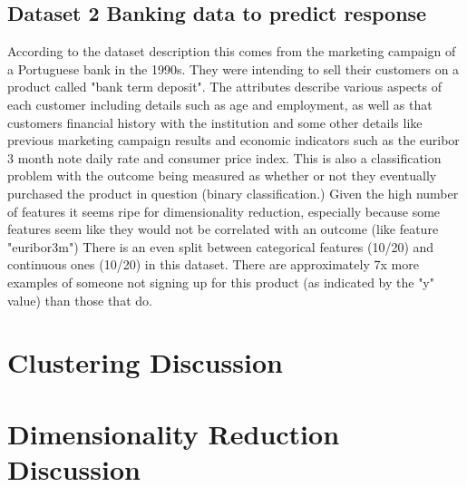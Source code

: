 \documentclass[11pt]{article}
\newcommand{\datasettwo}{Banking data to predict response}
\begin{document}
    \subsection{Dataset 2 \datasettwo}\label{subsec:dataset-2datasettwo}
    According to the dataset description this comes from the marketing campaign of a Portuguese bank in the 1990s.\cite{Dua:2019}
    They were intending to sell their customers on a product called "bank term deposit".
    The attributes describe various aspects of each customer including details such as age and employment, as well as that customers financial history with the institution and some other details like previous marketing campaign results and economic indicators such as the euribor 3 month note daily rate and consumer price index.
    This is also a classification problem with the outcome being measured as whether or not they eventually purchased the product in question (binary classification.)
    Given the high number of features it seems ripe for dimensionality reduction, especially because some features seem like they would not be correlated with an outcome (like feature "euribor3m")
    There is an even split between categorical features (10/20) and continuous ones (10/20) in this dataset.
    There are approximately 7x more examples of someone not signing up for this product (as indicated by the "y" value) than those that do.


    \section{Clustering Discussion}\label{sec:clustering-discussion}
    


    \section{Dimensionality Reduction Discussion}\label{sec:dimensionality-reduction-discussion}

    
\end{document}
